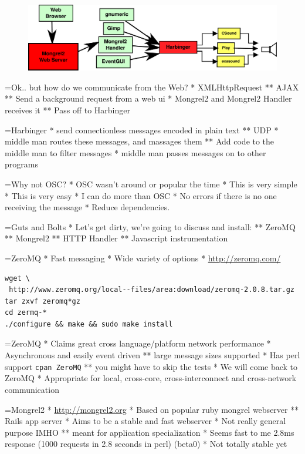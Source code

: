 \documentclass[titlepage,usenames,a4,landscape,semhelv]{seminar}
\begin{document}
\begin{slide}
\newslide

\begin{figure}
  \centering
\includegraphics[width=\textwidth]{mongrel2-example}  
\end{figure}

=Ok.. but how do we communicate from the Web?
* XMLHttpRequest
** AJAX
** Send a background request from a web ui
* Mongrel2 and Mongrel2 Handler receives it
** Pass off to Harbinger

=Harbinger
* send connectionless messages encoded in plain text
** UDP
* middle man routes these messages, and massages them
** Add code to the middle man to filter messages
* middle man passes messages on to other programs
 
=Why not OSC?
* OSC wasn't around or popular the time
* This is very simple
* This is very easy
* I can do more than OSC
* No errors if there is no one receiving the message
* Reduce dependencies.

=Guts and Bolts
* Let's get dirty, we're going to discuss and install:
** ZeroMQ
** Mongrel2
** HTTP Handler
** Javascript instrumentation

=ZeroMQ
* Fast messaging
* Wide variety of options
* \url{http://zeromq.com/}
\begin{verbatim}
wget \
 http://www.zeromq.org/local--files/area:download/zeromq-2.0.8.tar.gz
tar zxvf zeromq*gz
cd zermq-*
./configure && make && sudo make install
\end{verbatim}

=ZeroMQ
* Claims great cross language/platform network performance
* Asynchronous and easily event driven
** large message sizes supported
* Has perl support \texttt{cpan ZeroMQ}
** you might have to skip the tests
* We will come back to ZeroMQ
* Appropriate for local, cross-core, cross-interconnect and
cross-network communication


=Mongrel2
* \url{http://mongrel2.org}
* Based on popular ruby mongrel webserver
** Rails app server
* Aims to be a stable and fast webserver
* Not really general purpose IMHO
** meant for application specialization
* Seems fast to me 2.8ms response (1000 requests in 2.8 seconds in
perl) (beta0)
* Not totally stable yet


\end{slide}
\end{document}
